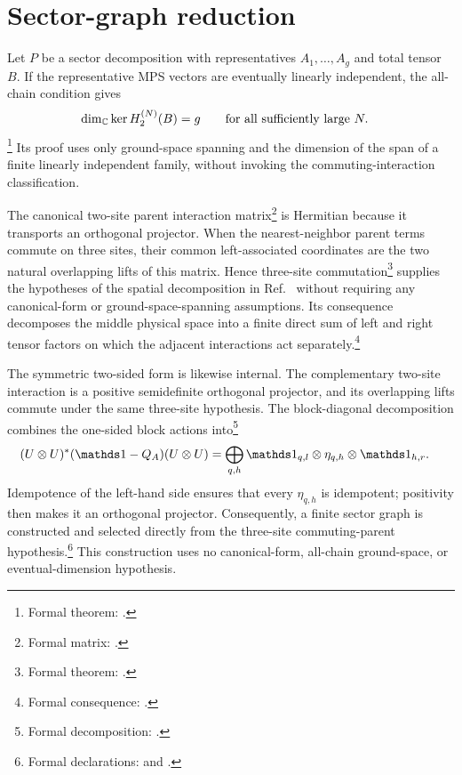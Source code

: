 \documentclass{article}
\begin{document}
\section{Sector-graph reduction}

Let $P$ be a sector decomposition with representatives
$A_1,\ldots,A_g$ and total tensor $B$. If the representative MPS vectors are
eventually linearly independent, the all-chain condition gives
\begin{align}
    \dim_{\mathbb{C}}\ker H_2^{(N)}(B)
        &=g
        \qquad\text{for all sufficiently large }N.
    \label{eq:cpsv16_nncph_ground_state_scope_eventual_ground_dimension}
\end{align}
\footnote{Formal theorem:
.}
Its proof uses only ground-space spanning and the dimension of the span of a
finite linearly independent family, without invoking the commuting-interaction
classification.

The canonical two-site parent interaction matrix\footnote{Formal matrix:
.} is Hermitian because it
transports an orthogonal projector. When the nearest-neighbor parent terms
commute on three sites, their common left-associated coordinates are the two
natural overlapping lifts of this matrix. Hence three-site
commutation\footnote{Formal theorem:
.}
supplies the hypotheses of the spatial decomposition in
Ref.~\cite{Cirac2016MPDO_arXiv} without requiring any canonical-form or
ground-space-spanning assumptions. Its consequence decomposes the middle
physical space into a finite direct sum of left and right tensor factors on
which the adjacent interactions act separately.\footnote{Formal consequence:
.}

The symmetric two-sided form is likewise internal. The complementary two-site
interaction is a positive semidefinite orthogonal projector, and its
overlapping lifts commute under the same three-site hypothesis. The
block-diagonal decomposition combines the one-sided block actions
into\footnote{Formal decomposition:
.}
\begin{align}
    (U\otimes U)^*(\one-Q_A)(U\otimes U)
        &=
        \bigoplus_{q,h}
        \one_{q,l}\otimes\eta_{q,h}\otimes\one_{h,r}.
    \label{eq:cpsv16_nncph_ground_state_scope_symmetric_block_decomposition}
\end{align}
Idempotence of the left-hand side ensures that every $\eta_{q,h}$ is idempotent;
positivity then makes it an orthogonal projector. Consequently, a finite sector
graph is constructed and selected directly from the three-site
commuting-parent hypothesis.\footnote{Formal declarations:
 and
.} This construction uses no
canonical-form, all-chain ground-space, or eventual-dimension hypothesis.
\end{document}
